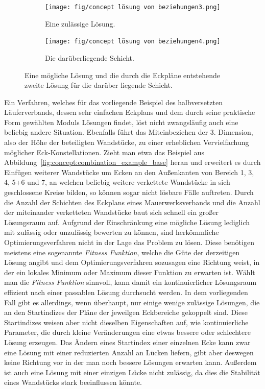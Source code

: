 \begin{figure}[ht!]
    \centering
    \begin{subfigure}[b]{0.4\columnwidth}
      \texttt{[image: fig/concept lösung von beziehungen3.png]}
      \caption{Eine zulässige Lösung.}\label{fig:concept:loesen_von_beziehungen3}
    \end{subfigure}
    \hfil
    \begin{subfigure}[b]{0.4\columnwidth}
      \texttt{[image: fig/concept lösung von beziehungen4.png]}
      \caption{Die darüberliegende Schicht.}\label{fig:concept:loesen_von_beziehungen4}
    \end{subfigure}
  \caption{Eine mögliche Lösung und die durch die Eckpläne entstehende zweite Lösung für die darüber liegende Schicht.}\label{fig:concept:loesen_von_beziehungen3und4}
\end{figure}

Ein Verfahren, welches für das vorliegende Beispiel des halbversetzten Läuferverbands, dessen sehr einfachen Eckplans und dem durch seine praktische Form gewählten Moduls Lösungen findet, löst nicht zwangsläufig auch eine beliebig andere Situation.
Ebenfalls führt das Miteinbeziehen der 3. Dimension, also der Höhe der beteiligten Wandstücke, zu einer erheblichen Vervielfachung möglicher Eck-Konstellationen.
Zieht man etwa das Beispiel aus Abbildung~\ref{fig:concept:combination_example_base} heran und erweitert es durch Einfügen weiterer Wandstücke um Ecken an den Außenkanten von Bereich 1, 3, 4, 5+6 und 7, an welchen beliebig weitere verkettete Wandstücke in sich geschlossene Kreise bilden, so können sogar nicht lösbare Fälle auftreten.
Durch die Anzahl der Schichten des Eckplans eines Mauerwerksverbands und die Anzahl der miteinander verketteten Wandstücke baut sich schnell ein großer Lösungsraum auf.
Aufgrund der Einschränkung eine mögliche Lösung lediglich mit zulässig oder unzulässig bewerten zu können, sind herkömmliche Optimierungsverfahren nicht in der Lage das Problem zu lösen.
Diese benötigen meistens eine sogenannte \textit{Fitness Funktion}, welche die Güte der derzeitigen Lösung angibt und dem Optimierungsverfahren sozusagen eine Richtung weist, in der ein lokales Minimum oder Maximum dieser Funktion zu erwarten ist.
Wählt man die \textit{Fitness Funktion} sinnvoll, kann damit ein kontinuierlicher Lösungsraum effizient nach einer passablen Lösung durchsucht werden.
In dem vorliegenden Fall gibt es allerdings, wenn überhaupt, nur einige wenige zulässige Lösungen, die an den Startindizes der Pläne der jeweilgen Eckbereiche gekoppelt sind.
Diese Startindizes weisen aber nicht dieselben Eigenschaften auf, wie kontinuierliche Parameter, die durch kleine Veränderungen eine etwas bessere oder schlechtere Lösung erzeugen.
Das Ändern eines Startindex einer einzelnen Ecke kann zwar eine Lösung mit einer reduzierten Anzahl an Lücken liefern, gibt aber deswegen keine Richtung vor in der man noch bessere Lösungen erwarten kann.
Außerdem ist auch eine Lösung mit einer einzigen Lücke nicht zulässig, da dies die Stabilität eines Wandstücks stark beeinflussen könnte.

